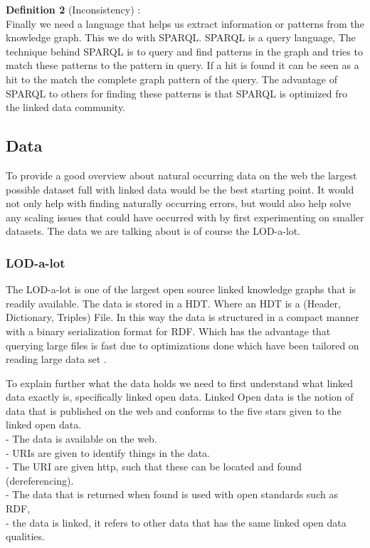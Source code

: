 \documentclass{article}
\begin{document}
\textbf{Definition 2} (Inconsistency) :\\

Finally we need a language that helps us extract information or patterns from the knowledge graph. This we do with SPARQL.
SPARQL is a query language, The technique behind SPARQL is to query and find patterns in the graph and tries to match these patterns to the pattern in query. If a hit is found it can be seen as a hit to the match the complete graph pattern of the query. The advantage of SPARQL to others for finding these patterns is that SPARQL is optimized fro the linked data community.  \cite{SPARQLPrimer:2013}


\subsection{Data}
To provide a good overview about natural occurring data on the web the largest possible dataset full with linked data would be the best starting point. It would not only help with finding naturally occurring errors, but would also help solve any scaling issues that could have occurred with by first experimenting on smaller datasets. The data we are talking about is of course the LOD-a-lot.

\subsubsection{LOD-a-lot}
The LOD-a-lot \cite{JavierD:2017} is one of the largest open source linked knowledge graphs that is readily available. The data is stored in a HDT. Where an HDT is a (Header, Dictionary, Triples) File. In this way the data is structured in a compact manner with a binary serialization format for RDF. Which has the advantage that querying large files is fast due to optimizations done which have been tailored on reading large data set \cite{JavierD:2013}.

To explain further what the data holds we need to first understand what linked data exactly is, specifically linked open data. Linked Open data is the notion of data that is published on the web and conforms to the five stars given to the linked open data. \cite{ChristianB:2009}\\
 - The data is available on the web.\\
 - URIs are given to identify things in the data.\\
 - The URI are given http, such that these can be located and found (dereferencing).\\
 - The data that is returned when found is used with open standards such as RDF,\\
 - the data is linked, it refers to other data that has the same linked open data qualities.\\
 
\end{document}
